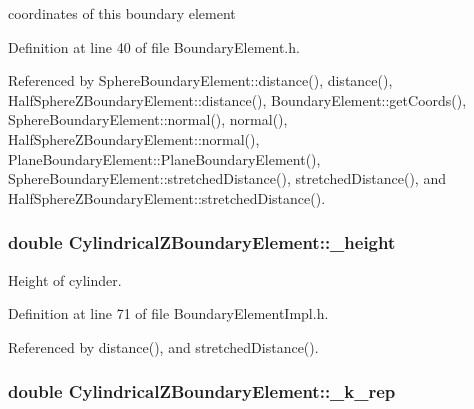 coordinates of this boundary element 



Definition at line 40 of file Boundary\+Element.\+h.



Referenced by Sphere\+Boundary\+Element\+::distance(), distance(), Half\+Sphere\+Z\+Boundary\+Element\+::distance(), Boundary\+Element\+::get\+Coords(), Sphere\+Boundary\+Element\+::normal(), normal(), Half\+Sphere\+Z\+Boundary\+Element\+::normal(), Plane\+Boundary\+Element\+::\+Plane\+Boundary\+Element(), Sphere\+Boundary\+Element\+::stretched\+Distance(), stretched\+Distance(), and Half\+Sphere\+Z\+Boundary\+Element\+::stretched\+Distance().

\hypertarget{classCylindricalZBoundaryElement_a5227f1150dc1a7dc212cfd4387e523fc}{
\subsubsection[{\+\_\+height}]{\setlength{\rightskip}{0pt plus 5cm}double Cylindrical\+Z\+Boundary\+Element\+::\+\_\+height\hspace{0.3cm}{\ttfamily [private]}}}\label{classCylindricalZBoundaryElement_a5227f1150dc1a7dc212cfd4387e523fc}


Height of cylinder. 



Definition at line 71 of file Boundary\+Element\+Impl.\+h.



Referenced by distance(), and stretched\+Distance().

\hypertarget{classCylindricalZBoundaryElement_a4cdd06d2f2f1ac84e0ef6872c812b6cc}{
\subsubsection[{\+\_\+k\+\_\+rep}]{\setlength{\rightskip}{0pt plus 5cm}double Cylindrical\+Z\+Boundary\+Element\+::\+\_\+k\+\_\+rep\hspace{0.3cm}{\ttfamily [private]}}}\label{classCylindricalZBoundaryElement_a4cdd06d2f2f1ac84e0ef6872c812b6cc}


